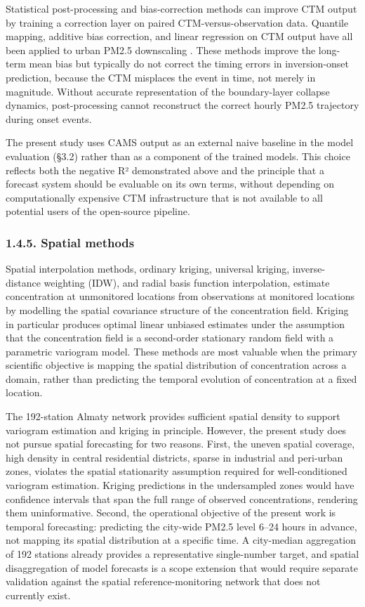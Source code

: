 Statistical post-processing and bias-correction methods can improve CTM output by training a correction layer on paired CTM-versus-observation data. Quantile mapping, additive bias correction, and linear regression on CTM output have all been applied to urban PM2.5 downscaling \cite{Wang2016CTM}. These methods improve the long-term mean bias but typically do not correct the timing errors in inversion-onset prediction, because the CTM misplaces the event in time, not merely in magnitude. Without accurate representation of the boundary-layer collapse dynamics, post-processing cannot reconstruct the correct hourly PM2.5 trajectory during onset events.

The present study uses CAMS output as an external naive baseline in the model evaluation (§3.2) rather than as a component of the trained models. This choice reflects both the negative R² demonstrated above and the principle that a forecast system should be evaluable on its own terms, without depending on computationally expensive CTM infrastructure that is not available to all potential users of the open-source pipeline.

\subsubsection{1.4.5. Spatial methods}\label{spatial-methods}

Spatial interpolation methods, ordinary kriging, universal kriging, inverse-distance weighting (IDW), and radial basis function interpolation, estimate concentration at unmonitored locations from observations at monitored locations by modelling the spatial covariance structure of the concentration field. Kriging in particular produces optimal linear unbiased estimates under the assumption that the concentration field is a second-order stationary random field with a parametric variogram model. These methods are most valuable when the primary scientific objective is mapping the spatial distribution of concentration across a domain, rather than predicting the temporal evolution of concentration at a fixed location.

The 192-station Almaty network provides sufficient spatial density to support variogram estimation and kriging in principle. However, the present study does not pursue spatial forecasting for two reasons. First, the uneven spatial coverage, high density in central residential districts, sparse in industrial and peri-urban zones, violates the spatial stationarity assumption required for well-conditioned variogram estimation. Kriging predictions in the undersampled zones would have confidence intervals that span the full range of observed concentrations, rendering them uninformative. Second, the operational objective of the present work is temporal forecasting: predicting the city-wide PM2.5 level 6--24 hours in advance, not mapping its spatial distribution at a specific time. A city-median aggregation of 192 stations already provides a representative single-number target, and spatial disaggregation of model forecasts is a scope extension that would require separate validation against the spatial reference-monitoring network that does not currently exist.

